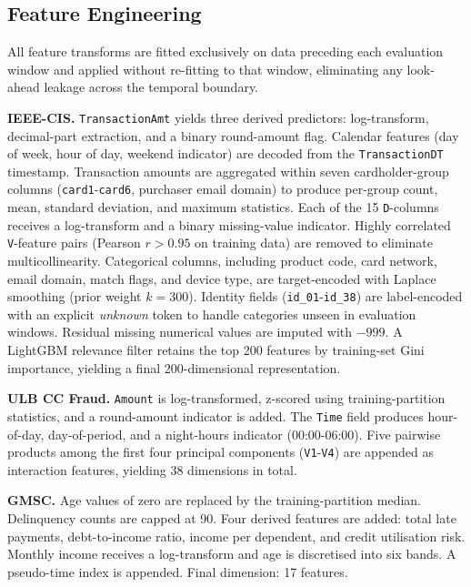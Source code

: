 \documentclass[pdflatex,sn-mathphys-num]{sn-jnl}
\theoremstyle{thmstyleone}
\theoremstyle{thmstyletwo}
\theoremstyle{thmstylethree}
\begin{document}
\subsection{Feature Engineering}\label{sec:exp:features}

All feature transforms are fitted exclusively on data preceding each evaluation
window and applied without re-fitting to that window, eliminating any
look-ahead leakage across the temporal boundary.

\textbf{IEEE-CIS.} \texttt{TransactionAmt} yields three derived predictors:
log-transform, decimal-part extraction, and a binary round-amount flag.
Calendar features (day of week, hour of day, weekend indicator) are decoded
from the \texttt{TransactionDT} timestamp. Transaction amounts are aggregated
within seven cardholder-group columns (\texttt{card1}-\texttt{card6},
purchaser email domain) to produce per-group count, mean, standard deviation,
and maximum statistics. Each of the 15 \texttt{D}-columns receives a
log-transform and a binary missing-value indicator. Highly correlated
\texttt{V}-feature pairs (Pearson $r > 0.95$ on training data) are removed to
eliminate multicollinearity. Categorical columns, including product code, card network,
email domain, match flags, and device type, are target-encoded with Laplace
smoothing (prior weight $k = 300$). Identity fields
(\texttt{id\_01}-\texttt{id\_38}) are label-encoded with an explicit
\textit{unknown} token to handle categories unseen in evaluation windows.
Residual missing numerical values are imputed with $-999$. A LightGBM
relevance filter retains the top 200 features by training-set Gini importance,
yielding a final 200-dimensional representation.


\textbf{ULB CC Fraud.} \texttt{Amount} is log-transformed, z-scored using
training-partition statistics, and a round-amount indicator is added.
The \texttt{Time} field produces hour-of-day, day-of-period, and a night-hours
indicator (00:00-06:00). Five pairwise products among the first four principal
components (\texttt{V1}-\texttt{V4}) are appended as interaction features,
yielding 38 dimensions in total.

\textbf{GMSC.} Age values of zero are replaced by the training-partition
median. Delinquency counts are capped at 90. Four derived features are
added: total late payments, debt-to-income ratio, income per dependent,
and credit utilisation risk. Monthly income receives a log-transform and
age is discretised into six bands. A pseudo-time index is appended.
Final dimension: 17 features.
\end{document}
